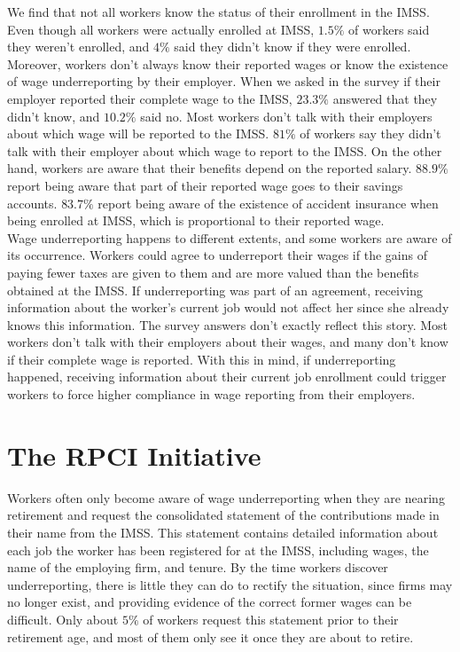 \documentclass[10pt, oneside]{book}
\begin{document}
\normalsize

We find that not all workers know the status of their enrollment in the IMSS. Even though all workers were actually enrolled at IMSS, $1.5\%$ of workers said they weren't enrolled, and $4\%$ said they didn't know if they were enrolled. Moreover, workers don't always know their reported wages or know the existence of wage underreporting by their employer. When we asked in the survey if their employer reported their complete wage to the IMSS, $23.3\%$ answered that they didn't know, and $10.2\%$ said no. Most workers don't talk with their employers about which wage will be reported to the IMSS. $81\%$ of workers say they didn't talk with their employer about which wage to report to the IMSS. On the other hand, workers are aware that their benefits depend on the reported salary. $88.9\%$ report being aware that part of their reported wage goes to their savings accounts. $83.7\%$ report being aware of the existence of accident insurance when being enrolled at IMSS, which is proportional to their reported wage. \\

Wage underreporting happens to different extents, and some workers are aware of its occurrence. Workers could agree to underreport their wages if the gains of paying fewer taxes are given to them and are more valued than the benefits obtained at the IMSS. If underreporting was part of an agreement, receiving information about the worker's current job would not affect her since she already knows this information. The survey answers don't exactly reflect this story. Most workers don't talk with their employers about their wages, and many don't know if their complete wage is reported. With this in mind, if underreporting happened, receiving information about their current job enrollment could trigger workers to force higher compliance in wage reporting from their employers.



\section{The RPCI Initiative}

Workers often only become aware of wage underreporting when they are nearing retirement and request the consolidated statement of the contributions made in their name from the IMSS. This statement contains detailed information about each job the worker has been registered for at the IMSS, including wages, the name of the employing firm, and tenure. By the time workers discover underreporting, there is little they can do to rectify the situation, since firms may no longer exist, and providing evidence of the correct former wages can be difficult. Only about $5\%$ of workers request this statement prior to their retirement age, and most of them only see it once they are about to retire. \\ 
\end{document}
